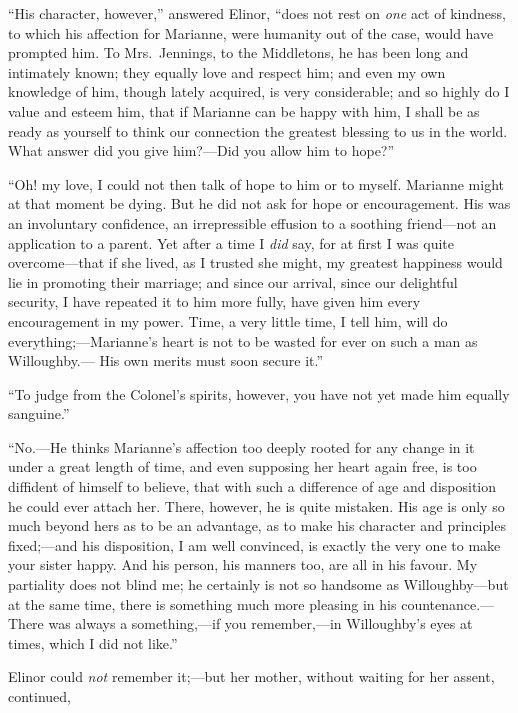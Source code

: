 \documentclass{article}
\begin{document}
``His character, however,'' answered Elinor, ``does not rest
on \emph{one} act of kindness, to which his affection for Marianne,
were humanity out of the case, would have prompted him.
To Mrs.\ Jennings, to the Middletons, he has been long
and intimately known; they equally love and respect him;
and even my own knowledge of him, though lately acquired,
is very considerable; and so highly do I value and esteem him,
that if Marianne can be happy with him, I shall be as ready
as yourself to think our connection the greatest blessing
to us in the world.  What answer did you give him?---Did you
allow him to hope?''

``Oh! my love, I could not then talk of hope to him
or to myself.  Marianne might at that moment be dying.
But he did not ask for hope or encouragement.  His was
an involuntary confidence, an irrepressible effusion
to a soothing friend---not an application to a parent.
Yet after a time I \emph{did} say, for at first I was quite
overcome---that if she lived, as I trusted she might,
my greatest happiness would lie in promoting their marriage;
and since our arrival, since our delightful security,
I have repeated it to him more fully, have given him every
encouragement in my power.  Time, a very little time,
I tell him, will do everything;---Marianne's heart is
not to be wasted for ever on such a man as Willoughby.---%
His own merits must soon secure it.''

``To judge from the Colonel's spirits, however,
you have not yet made him equally sanguine.''

``No.---He thinks Marianne's affection too deeply
rooted for any change in it under a great length of time,
and even supposing her heart again free, is too diffident
of himself to believe, that with such a difference of age
and disposition he could ever attach her.  There, however,
he is quite mistaken.  His age is only so much beyond
hers as to be an advantage, as to make his character and
principles fixed;---and his disposition, I am well convinced,
is exactly the very one to make your sister happy.
And his person, his manners too, are all in his favour.
My partiality does not blind me; he certainly is not
so handsome as Willoughby---but at the same time,
there is something much more pleasing in his countenance.---%
There was always a something,---if you remember,---in Willoughby's
eyes at times, which I did not like.''

Elinor could \emph{not} remember it;---but her mother,
without waiting for her assent, continued,
\end{document}
